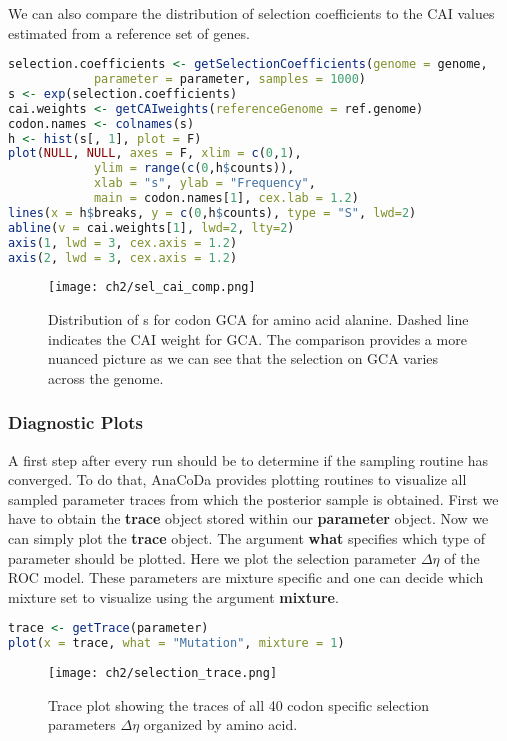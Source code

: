 We can also compare the distribution of selection coefficients to the CAI values estimated from a reference set of
genes.

\begin{lstlisting}[language=R]
selection.coefficients <- getSelectionCoefficients(genome = genome,
			parameter = parameter, samples = 1000)
s <- exp(selection.coefficients)
cai.weights <- getCAIweights(referenceGenome = ref.genome)
codon.names <- colnames(s)
h <- hist(s[, 1], plot = F)
plot(NULL, NULL, axes = F, xlim = c(0,1), 
			ylim = range(c(0,h$counts)),
			xlab = "s", ylab = "Frequency", 
			main = codon.names[1], cex.lab = 1.2)
lines(x = h$breaks, y = c(0,h$counts), type = "S", lwd=2)
abline(v = cai.weights[1], lwd=2, lty=2)
axis(1, lwd = 3, cex.axis = 1.2)
axis(2, lwd = 3, cex.axis = 1.2)
\end{lstlisting}

\begin{figure}[h]
  \centering
  \texttt{[image: ch2/sel\_cai\_comp.png]}\\
  \caption{Distribution of s for codon GCA for amino acid alanine. Dashed line indicates the CAI weight for
GCA. The comparison provides a more nuanced picture as we can see that the selection on GCA varies
across the genome.}
  \label{fig:sne_dummy}
\end{figure} 

\subsubsection{Diagnostic Plots}
A first step after every run should be to determine if the sampling routine has converged. 
To do that, AnaCoDa provides plotting routines to visualize all sampled parameter traces from which the posterior sample is obtained.
First we have to obtain the \textbf{trace} object stored within our \textbf{parameter} object. 
Now we can simply plot the \textbf{trace} object. The argument \textbf{what} specifies which type of parameter should be plotted.
Here we plot the selection parameter $\Delta \eta$ of the ROC model. 
These parameters are mixture specific and one can decide which mixture set to visualize using the argument \textbf{mixture}.

\begin{lstlisting}[language=R]
trace <- getTrace(parameter)
plot(x = trace, what = "Mutation", mixture = 1)
\end{lstlisting}

\begin{figure}[h]
  \centering
  \texttt{[image: ch2/selection\_trace.png]}\\
  \caption{Trace plot showing the traces of all 40 codon specific selection parameters $\Delta \eta$ organized by amino acid.}
  \label{fig:mutation_trace}
\end{figure} 


